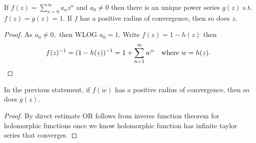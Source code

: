 \documentclass[a4paper,12pt]{article}
\begin{document}
\begin{theorem}[Reciprocal] 
    If $f(z)=\sum_{n=0}^\infty a_nz^n$ and $a_0\neq0$ then there is an unique power series $g(z)$ s.t. $f(z)=g(z)=1.$ If $f$ has a positive radius of convergence, then so does $z.$
    \begin{proof}
        As $a_0\neq0,$ then WLOG $a_0=1.$ Write $f(z)=1-h(z)$ then \begin{align}
            f(z)^{-1}=(1-h(z))^{-1}=1+\sum_{n=1}^\infty w^n\quad \text{where }w=h(z).
        \end{align}
    \end{proof}
\end{theorem}
\begin{theorem}
    In the previous statement, if $f(w)$ has a positive radius of convergence, then so does $g(z).$
    \begin{proof}
        By direct estimate OR follows from inverse function theorem for holomorphic functions once we know holomorphic function has infinite taylor series that converges.
    \end{proof}
\end{theorem}
\end{document}
